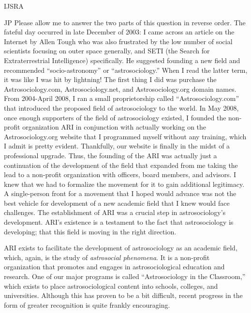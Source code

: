 \begin{labeling}{IJSRA}
	\item[JP] Please allow me to answer the two parts of this question in reverse order. The fateful day occurred in late December of 2003: I came across an article on the Internet by Allen Tough who was also frustrated by the low number of social scientists focusing on outer space generally, and SETI (the Search for Extraterrestrial Intelligence) specifically. He suggested founding a new field and recommended “socio-astronomy” or “astrosociology.” When I read the latter term, it was like I was hit by lightning! The first thing I did was purchase the Astrosociology.com, Astrosociology.net, and Astrosociology.org domain names. From 2004-April 2008, I ran a small proprietorship called “Astrosociology.com” that introduced the proposed field of astrosociology to the world. In May 2008, once enough supporters of the field of astrosociology existed, I founded the non-profit organization ARI in conjunction with actually working on the Astrosociology.org website that I programmed myself without any training, which I admit is pretty evident. Thankfully, our website is finally in the midst of a professional upgrade. Thus, the founding of the ARI was actually just a continuation of the development of the field that expanded from me taking the lead to a non-profit organization with officers, board members, and advisors. I knew that we had to formalize the movement for it to gain additional legitimacy. A single-person front for a movement that I hoped would advance was not the best vehicle for development of a new academic field that I knew would face challenges. The establishment of ARI was a crucial step in astrosociology’s development. ARI’s existence is a testament to the fact that astrosociology is developing; that this field is moving in the right direction.

	ARI exists to facilitate the development of astrosociology as an academic field, which, again, is the study of \emph{astrosocial phenomena}. It is a non-profit organization that promotes and engages in astrosociological education and research. One of our major programs is called “Astrosociology in the Classroom,” which exists to place astrosociological content into schools, colleges, and universities. Although this has proven to be a bit difficult, recent progress in the form of greater recognition is quite frankly encouraging.


\end{labeling}
